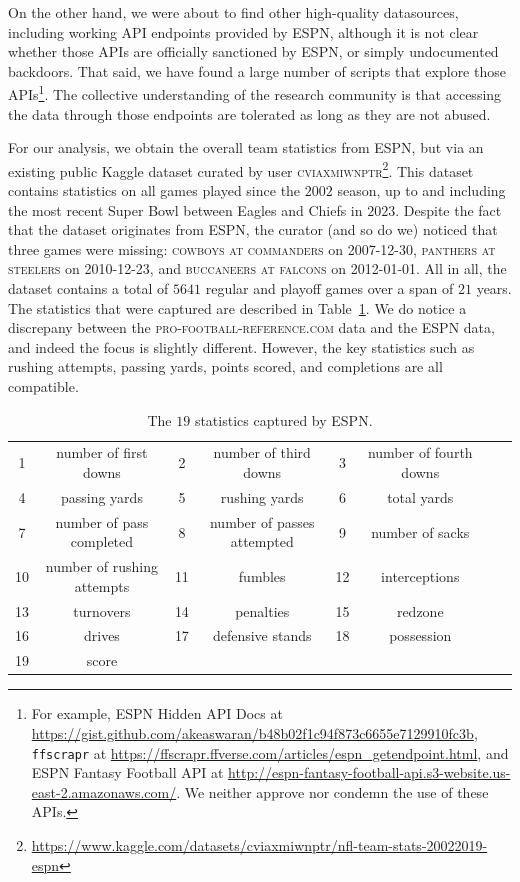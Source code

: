 \documentclass[10pt]{article}
\begin{document}
On the other hand,
we were about to find other high-quality datasources, including working API endpoints
 provided by ESPN,
although it is not clear whether those APIs are officially sanctioned by ESPN, or simply
undocumented backdoors. That said, we have
found a large number of scripts that explore those APIs\footnote{
For example,
ESPN Hidden API Docs at 
\url{https://gist.github.com/akeaswaran/b48b02f1c94f873c6655e7129910fc3b},
\texttt{ffscrapr} at
\url{https://ffscrapr.ffverse.com/articles/espn_getendpoint.html},
and ESPN Fantasy Football API at
\url{http://espn-fantasy-football-api.s3-website.us-east-2.amazonaws.com/}. We neither
approve nor condemn the use of these APIs.}.
The collective understanding
of the research community is that accessing the data through those endpoints are tolerated
as long as they are not abused.

For our analysis, we obtain the overall team statistics from ESPN, but via an existing
public Kaggle dataset curated by user \textsc{cviaxmiwnptr}\footnote{
\url{https://www.kaggle.com/datasets/cviaxmiwnptr/nfl-team-stats-20022019-espn}}.
This dataset contains statistics on all games played since the $2002$ season, up to and
including the most recent Super Bowl between Eagles and Chiefs in $2023$. Despite the fact
that the dataset originates from ESPN, the curator (and so do we) noticed that three games
were missing: \textsc{cowboys at commanders} on 2007-12-30, \textsc{panthers at steelers}
on 2010-12-23, and \textsc{buccaneers at falcons} on 2012-01-01. All in all, the dataset
contains a total of $5641$ regular and playoff games over a span of $21$ years. The
statistics that were captured are described in Table~\ref{table:espn-features}. We do
notice a discrepany between the \textsc{pro-football-reference.com} data and the
ESPN data, and indeed the focus is slightly different. However, the key statistics such
as rushing attempts, passing yards, points scored, and completions are all compatible.

\begin{table}
\begin{tabular}{|cc|cc|cc|cc|}
\hline
1 & number of first downs & 2 & number of third downs & 3 & number of fourth downs \\
4 & passing yards & 5 & rushing yards & 6 & total yards \\
7 & number of pass completed & 8 & number of passes attempted & 9 & number of sacks \\
10 & number of rushing attempts & 11 & fumbles & 12 & interceptions \\
13 & turnovers & 14 & penalties & 15 & redzone \\
16 & drives & 17 & defensive stands & 18 & possession \\
19 & score & & & & \\ \hline
\end{tabular}
\caption{The $19$ statistics captured by ESPN.}
\label{table:espn-features}
\end{table}
\end{document}
